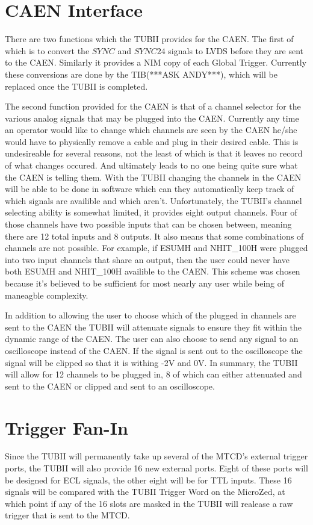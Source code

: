 \documentclass[11pt,a4paper]{article}
\begin{document}
\section{CAEN Interface}
There are two functions which the TUBII provides for the CAEN. The first of which is to convert the $SYNC$ and $SYNC24$ signals to LVDS before they are sent to the CAEN. Similarly it provides a NIM copy of each Global Trigger. Currently these conversions are done by the TIB(***ASK ANDY***), which will be replaced once the TUBII is completed. 

 The second function provided for the CAEN is that of a channel selector for the various analog signals that may be plugged into the CAEN. Currently any time an operator would like to change which channels are seen by the CAEN he/she would have to physically remove a cable and plug in their desired cable. This is undesireable for several reasons, not the least of which is that it leaves no record of what changes occured. And ultimately leads to no one being quite sure what the CAEN is telling them. With the TUBII changing the channels in the CAEN will be able to be done in software which can they automatically keep track of which signals are availible and which aren't. Unfortunately, the TUBII's channel selecting ability is somewhat limited, it provides eight output channels. Four of those channels have two possible inputs that can be chosen between, meaning there are 12 total inputs and 8 outputs. It also means that some combinations of channels are not possible. For example, if ESUMH and NHIT\_100H were plugged into two input channels that share an output, then the user could never have both ESUMH and NHIT\_100H availible to the CAEN. This scheme was chosen because it's believed to be sufficient for most nearly any user while being of maneagble complexity.
 
    In addition to allowing the user to choose which of the plugged in channels are sent to the CAEN the TUBII will attenuate signals to ensure they fit within the dynamic range of the CAEN. The user can also choose to send any signal to an oscilloscope instead of the CAEN. If the signal is sent out to the oscilloscope the signal will be clipped so that it is withing -2V and 0V. In summary, the TUBII will allow for 12 channels to be plugged in, 8 of which can either attenuated and sent to the CAEN or clipped and sent to an oscilloscope. 
\section{Trigger Fan-In}
Since the TUBII will permanently take up several of the MTCD's external trigger ports, the TUBII will also provide 16 new external ports. Eight of these ports will be designed for ECL signals, the other eight will be for TTL inputs. These 16 signals will be compared with the TUBII Trigger Word on the MicroZed, at which point if any of the 16 slots are masked in the TUBII will realease a raw trigger that is sent to the MTCD.
\end{document}
